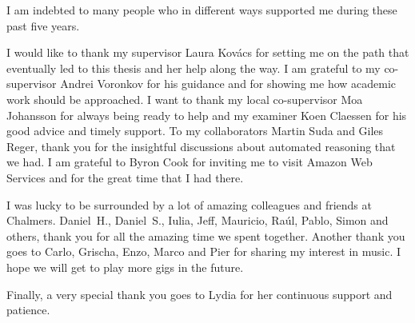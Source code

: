 I am indebted to many people who in different ways supported me during these past five years.

I would like to thank my supervisor Laura Kov\'acs for setting me on the path that eventually led to this thesis and her help along the way. I am grateful to my co-supervisor Andrei Voronkov for his guidance and for showing me how academic work should be approached. I want to thank my local co-supervisor Moa Johansson for always being ready to help and my examiner Koen Claessen for his good advice and timely support. To my collaborators Martin Suda and Giles Reger, thank you for the insightful discussions about automated reasoning that we had. I am grateful to Byron Cook for inviting me to visit Amazon Web Services and for the great time that I had there.

I was lucky to be surrounded by a lot of amazing colleagues and friends at Chalmers. Daniel~H., Daniel~S., Iulia, Jeff, Mauricio, Ra\'ul, Pablo, Simon and others, thank you for all the amazing time we spent together. Another thank you goes to Carlo, Grischa, Enzo, Marco and Pier for sharing my interest in music. I hope we will get to play more gigs in the future.

Finally, a very special thank you goes to Lydia for her continuous support and patience.
